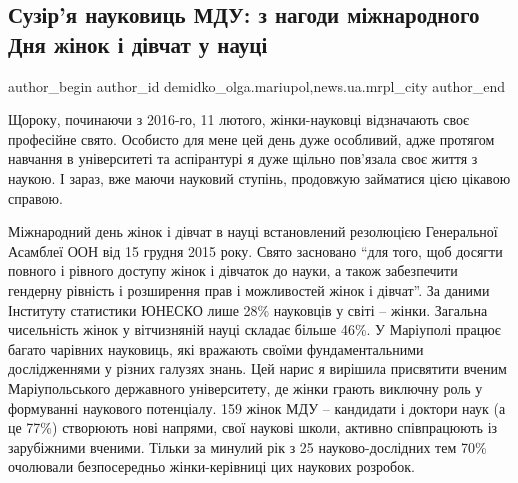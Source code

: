  
 
 
 
 
 
\subsection{Сузір'я науковиць МДУ: з нагоди міжнародного Дня жінок і дівчат у науці}
\label{sec:12_02_2021.stz.news.ua.mrpl_city.1.suzirja_naukovyc_mdu}
 
\ifcmt
 author_begin
   author_id demidko_olga.mariupol,news.ua.mrpl_city
 author_end
\fi

Щороку, починаючи з 2016-го, 11 лютого, жінки-науковці відзначають своє
професійне свято. Особисто для мене цей день дуже особливий, адже протягом
навчання в університеті та аспірантурі я дуже щільно пов'язала своє життя з
наукою. І зараз, вже маючи науковий ступінь, продовжую займатися цією цікавою
справою. 

Міжнародний день жінок і дівчат в науці встановлений резолюцією Генеральної
Асамблеї ООН від 15 грудня 2015 року. Свято засновано \enquote{для того, щоб досягти
повного і рівного доступу жінок і дівчаток до науки, а також забезпечити
гендерну рівність і розширення прав і можливостей жінок і дівчат}. За даними
Інституту статистики ЮНЕСКО лише 28\% науковців у світі – жінки. Загальна
чисельність жінок у вітчизняній науці складає більше 46\%. У Маріуполі працює
багато чарівних науковиць, які вражають своїми фундаментальними дослідженнями у
різних галузях знань. Цей нарис я вирішила присвятити вченим Маріупольського
державного університету, де жінки грають виключну роль у формуванні наукового
потенціалу. 159 жінок МДУ – кандидати і доктори наук (а це 77\%) створюють нові
напрями, свої наукові школи, активно співпрацюють із зарубіжними вченими.
Тільки за минулий рік з 25 науково-дослідних тем 70\% очолювали безпосередньо
жінки-керівниці цих наукових розробок.

